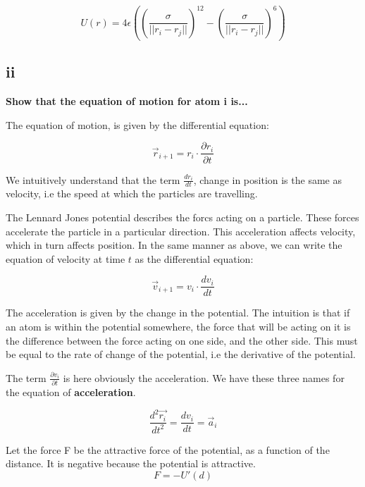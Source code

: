 \documentclass[a4paper,10pt,english]{article}
\begin{document}
\begin{equation}
U(r) = 4\epsilon \left(   (\frac{\sigma}{|| r_i - r_j || })^{12} -   (\frac{\sigma}{|| r_i - r_j || })^6 \right)
\end{equation}

\subsection*{ii}
\textbf{Show that the equation of motion for atom i is...}

The equation of motion, is given by the differential equation:

\begin{equation}
\vec{r}_{i+1} = r_{i} \cdot \frac{\partial r_{i}}{\partial t}
\end{equation}

We intuitively understand that the term $\frac{d r_{i}}{d t}$, change in position is the same as velocity, i.e the speed at which the particles are travelling. 

The Lennard Jones potential describes the forcs  acting on a particle. These forces accelerate the particle in a particular direction. This acceleration affects velocity, which in turn affects position. In the same manner as above, we can write the equation of velocity at time $t$ as the differential equation:

\begin{equation}
\vec{v}_{i+1} = v_{i} \cdot \frac{d v_{i}}{d t}
\end{equation}

The acceleration is given by the change in the potential. The intuition is that if an atom is within the potential somewhere, the force that will be acting on it is the difference between the force acting on one side, and the other side. This must be equal to the rate of change of the potential, i.e the derivative of the potential.

The term $\frac{\partial v_{i}}{\partial t}$ is here obviously the acceleration. We have these three names for the equation of \textbf{acceleration}.

\begin{equation}
 \frac{d^2 \vec{r_i}}{dt^2} =  \frac{d v_{i}}{d t}   = \vec{a}_i
\end{equation}

Let the force F be the attractive force of the potential, as a function of the distance. It is negative because the potential is attractive.
\begin{equation}
F = -U'(d)
\end{equation}
\end{document}
